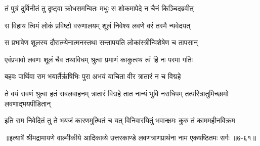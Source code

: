 \twolineshloka
{तं पुत्रं दुर्विनीतं तु दृष्ट्वा क्रोधसमन्वितः}
{मधुः स शोकमापेदे न चैनं किञ्चिदब्रवीत्} %

\twolineshloka
{स विहाय त्विमं लोकं प्रविष्टो वरुणालयम्}
{शूलं निवेश्य लवणे वरं तस्मै न्यवेदयत्} %

\twolineshloka
{स प्रभावेण शूलस्य दौरात्म्येनात्मनस्तथा}
{सन्तापयति लोकांस्त्रीन्विशेषेण च तापसान्} %

\twolineshloka
{एवंप्रभावो लवणः शूलं चैव तथाविधम्}
{श्रुत्वा प्रमाणं काकुत्स्थ त्वं हि नः परमा गतिः} %

\twolineshloka
{बहवः पार्थिवा राम भयार्तैर्ऋषिभिः पुरा}
{अभयं याचिता वीर त्रातारं न च विद्महे} %

\threelineshloka
{ते वयं रावणं श्रुत्वा हतं सबलवाहनम्}
{त्रातारं विद्महे तात नान्यं भुवि नराधिपम्}
{तत्परित्रातुमिच्छामो लवणाद्भयपीडितान्} %

\twolineshloka
{इति राम निवेदितं तु ते भयजं कारणमुत्थितं च यत्}
{विनिवारयितुं भवान्क्षमः कुरु तं काममहीनविक्रम} %


॥इत्यार्षे श्रीमद्रामायणे वाल्मीकीये आदिकाव्ये उत्तरकाण्डे लवणत्राणप्रार्थना नाम एकषष्ठितमः सर्गः ॥७-६१॥
